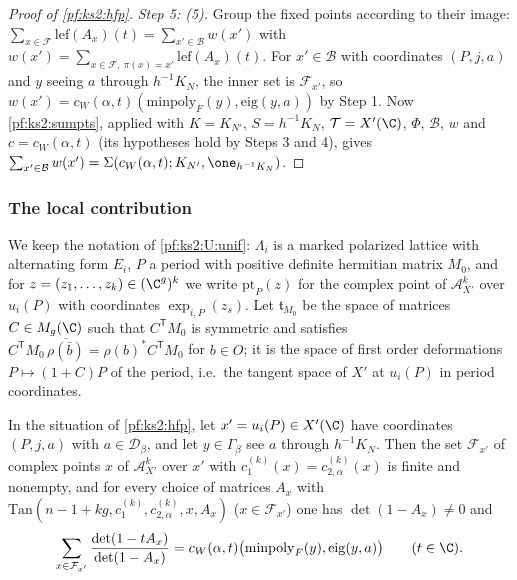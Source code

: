 \begin{proof}[Proof of \cref{pf:ks2:hfp}]
\emph{Step 5: (5).} Group the fixed points according to their image: $\sum_{x\in\mathcal
F}\mathrm{lef}(A_x)(t)=\sum_{x'\in\mathcal B}w(x')$ with $w(x')=\sum_{x\in\mathcal F,\ \pi(x)=x'}\mathrm{lef}
(A_x)(t)$. For $x'\in\mathcal B$ with coordinates $(P,j,a)$ and $y$ seeing $a$ through $h^{-1}K_N$, the
inner set is $\mathcal F_{x'}$, so $w(x')=c_W(\alpha,t)(\mathrm{minpoly}_F(y),\mathrm{eig}(y,a))$ by Step 1.
Now \cref{pf:ks2:sumpts}, applied with $K=K_{N'}$, $S=h^{-1}K_N$, $\mathcal T=X'(\C)$, $\Phi$, $\mathcal B$,
$w$ and $c=c_W(\alpha,t)$ (its hypotheses hold by Steps 3 and 4), gives
$\sum_{x'\in\mathcal B}w(x')=\Sigma(c_W(\alpha,t);K_{N'},\one_{h^{-1}K_N})$.
\end{proof}

\subsubsection{The local contribution}

We keep the notation of \ref{pf:ks2:U:unif}: $\Lambda_i$ is a marked polarized lattice with alternating form $E_i$, $P$ a period
with positive definite hermitian matrix $M_0$, and for $z=(z_1,\dots,z_k)\in(\C^g)^k$ we write
$\mathrm{pt}_P(z)$ for the complex point of $\mathcal A_{X'}^k$ over $u_i(P)$ with coordinates
$\exp_{i,P}(z_s)$. Let $\mathfrak{t}_{M_0}$ be the space of matrices $C\in M_g(\C)$ such that $C^{\mathsf
T}M_0$ is symmetric and satisfies $C^{\mathsf T}M_0\,\overline{\rho(\bar b)}=\rho(b)^{*}C^{\mathsf T}M_0$
for $b\in O$; it is the space of first
order deformations $P\mapsto(1+C)P$ of the period, i.e.\ the tangent space of $X'$ at $u_i(P)$ in period
coordinates.

\begin{proposition}\label{pf:ks2:fixloc}
In the situation of \cref{pf:ks2:hfp}, let $x'=u_i(P)\in X'(\C)$ have coordinates $(P,j,a)$ with
$a\in\mathcal{D}_\beta$, and let $y\in\Gamma_\beta$ see $a$ through $h^{-1}K_N$. Then the set $\mathcal F_{x'}$
of complex points $x$ of $\mathcal A_{X'}^k$ over $x'$ with $c_1^{(k)}(x)=c_{2,\alpha}^{(k)}(x)$ is finite and
nonempty, and for every choice of matrices $A_x$ with $\mathrm{Tan}(n-1+kg,c_1^{(k)},c_{2,\alpha}^{(k)},
x,A_x)$ ($x\in\mathcal F_{x'}$) one has $\det(1-A_x)\ne0$ and
\[
\sum_{x\in\mathcal F_{x'}}\frac{\det(1-tA_x)}{\det(1-A_x)}=c_W(\alpha,t)\bigl(\mathrm{minpoly}_F(y),\mathrm{eig}(y,a)\bigr)
\qquad(t\in\C).
\]
\end{proposition}

